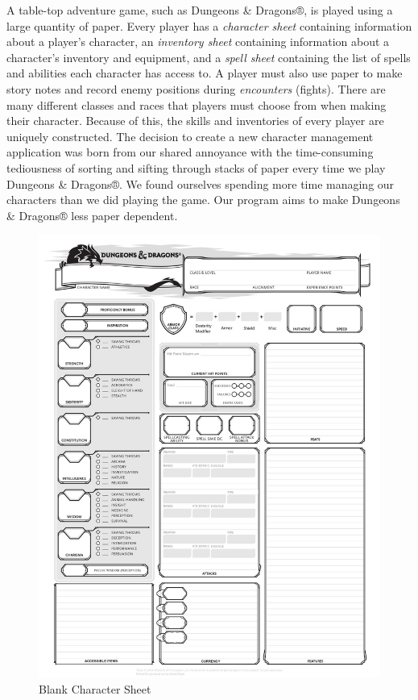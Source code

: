 \documentclass[10pt,conference,onecolumn,compsoc]{IEEEtran}
\begin{document}
A table-top adventure game, such as Dungeons \& Dragons®, is played using a large quantity of paper. Every player has a \textit{character sheet} containing information about a player's character, an \textit{inventory sheet} containing information about a character's inventory and equipment, and a \textit{spell sheet} containing the list of spells and abilities each character has access to. A player must also use paper to make story notes and record enemy positions during \textit{encounters} (fights). There are many different classes and races that players must choose from when making their character. Because of this, the skills and inventories of every player are uniquely constructed. 
The decision to create a new character management application was born from our shared annoyance with the time-consuming tediousness of sorting and sifting through stacks of paper every time we play Dungeons \& Dragons®. We found ourselves spending more time managing our characters than we did playing the game. Our program aims to make Dungeons \& Dragons® less paper dependent. 
\begin{figure}[h!]
\label{CharacterSheet}
\centering\includegraphics[scale=.15]{chrSheet.jpg}
\caption{Blank Character Sheet}
\end{figure}
\end{document}

